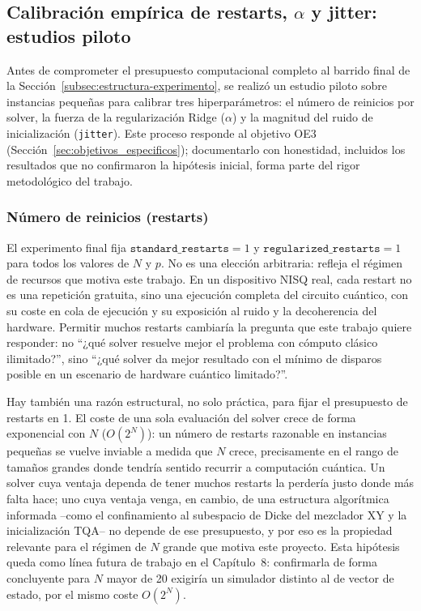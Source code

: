 \subsection{Calibración empírica de restarts, $\alpha$ y jitter: estudios piloto}
\label{subsec:calibracion_empirica}

Antes de comprometer el presupuesto computacional completo al barrido final de la Sección~\ref{subsec:estructura-experimento}, se realizó un estudio piloto sobre instancias pequeñas para calibrar tres hiperparámetros: el número de reinicios por solver, la fuerza de la regularización Ridge ($\alpha$) y la magnitud del ruido de inicialización (\texttt{jitter}). Este proceso responde al objetivo OE3 (Sección~\ref{sec:objetivos_especificos}); documentarlo con honestidad, incluidos los resultados que no confirmaron la hipótesis inicial, forma parte del rigor metodológico del trabajo.

\subsubsection{Número de reinicios (restarts)}
\label{subsubsec:restarts-ablation}

El experimento final fija $\texttt{standard\_restarts}=1$ y $\texttt{regularized\_restarts}=1$ para
todos los valores de $N$ y $p$. No es una elección arbitraria: refleja el régimen de recursos que
motiva este trabajo. En un dispositivo NISQ real, cada restart no es una repetición gratuita, sino
una ejecución completa del circuito cuántico, con su coste en cola de ejecución y su exposición al
ruido y la decoherencia del hardware. Permitir muchos restarts cambiaría la pregunta que este
trabajo quiere responder: no ``¿qué solver resuelve mejor el problema con cómputo clásico
ilimitado?'', sino ``¿qué solver da mejor resultado con el mínimo de disparos posible en un
escenario de hardware cuántico limitado?''.

Hay también una razón estructural, no solo práctica, para fijar el presupuesto de restarts en 1.
El coste de una sola evaluación del solver crece de forma exponencial con $N$ ($O(2^N)$): un número
de restarts razonable en instancias pequeñas se vuelve inviable a medida que $N$ crece, precisamente
en el rango de tamaños grandes donde tendría sentido recurrir a computación cuántica. Un solver cuya
ventaja dependa de tener muchos restarts la perdería justo donde más falta hace; uno cuya ventaja
venga, en cambio, de una estructura algorítmica informada --como el confinamiento al subespacio de
Dicke del mezclador XY y la inicialización TQA-- no depende de ese presupuesto, y por eso es la
propiedad relevante para el régimen de $N$ grande que motiva este proyecto. Esta hipótesis queda
como línea futura de trabajo en el Capítulo~8: confirmarla de forma concluyente para $N$ mayor de 20
exigiría un simulador distinto al de vector de estado, por el mismo coste $O(2^N)$.

